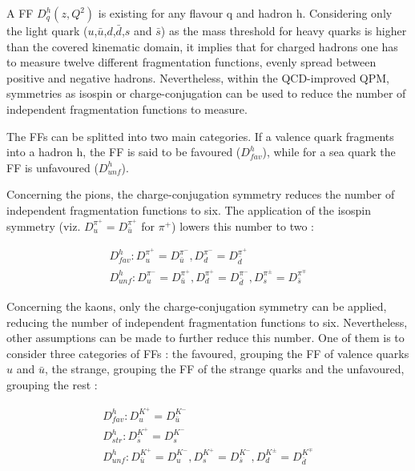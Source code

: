 A FF $D^h_q(z,Q^2)$ is existing for any flavour q and hadron h. Considering only the light quark ($u$,$\bar{u}$,$d$,$\bar{d}$,$s$ and $\bar{s}$) as the mass
threshold for heavy quarks is higher than the covered kinematic domain, it implies that for charged hadrons one has to measure twelve different fragmentation
functions, evenly spread between positive and negative hadrons. Nevertheless, within the QCD-improved QPM, symmetries as isospin or charge-conjugation can be
used to reduce the number of independent fragmentation functions to measure.

The FFs can be splitted into two main categories. If a valence quark fragments into a hadron h, the FF is said to be favoured ($D^h_{fav}$), while for a sea quark the FF is unfavoured ($D^h_{unf}$).

Concerning the pions, the charge-conjugation symmetry reduces the number of independent fragmentation functions to six. The application of the isospin symmetry (viz. $D^{\pi^+}_u = D^{\pi^+}_{\bar{u}}$ for $\pi^+$) lowers this number to two :

\begin{equation}
  \begin{split}
    D^h_{fav} : D^{\pi^+}_u = D^{\pi^-}_{\bar{u}}, D^{\pi^-}_d = D^{\pi^+}_{\bar{d}} \\
    D^h_{unf} : D^{\pi^-}_u = D^{\pi^+}_{\bar{u}}, D^{\pi^+}_d = D^{\pi^-}_{\bar{d}}, D^{\pi^{\pm}}_s = D^{\pi^{\mp}}_{\bar{s}}
  \end{split}
\end{equation}

Concerning the kaons, only the charge-conjugation symmetry can be applied, reducing the number of independent fragmentation functions to six. Nevertheless, other assumptions can be made to further reduce this number. One of them is to consider three categories of FFs : the favoured, grouping the FF of valence quarks $u$ and $\bar{u}$, the strange, grouping the FF of the strange quarks and the unfavoured, grouping the rest :

\begin{equation}
  \begin{split}
    D^h_{fav} : D^{K^+}_u = D^{K^-}_{\bar{u}} \\
    D^h_{str} : D^{K^+}_{\bar{s}} = D^{K^-}_{s} \\
    D^h_{unf} : D^{K^+}_{\bar{u}} = D^{K^-}_{u}, D^{K^+}_s = D^{K^-}_{\bar{s}}, D^{K^{\pm}}_{d} = D^{K^{\mp}}_{\bar{d}}
  \end{split}
\end{equation}

